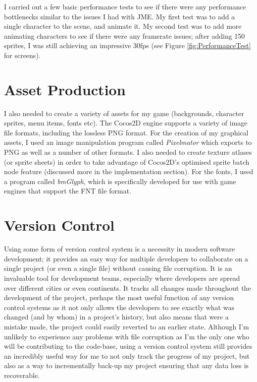 \documentclass[a4paper,oneside]{report}
\begin{document}
I carried out a few basic performance tests to see if there were any performance bottlenecks similar to the issues I had with JME. My first test was to add a single character to the scene, and animate it. My second test was to add more animating characters to see if there were any framerate issues; after adding 150 sprites, I was still achieving an impressive 30fps (see Figure \ref{fig:PerformanceTest} for screens). 

\section{Asset Production}

I also needed to create a variety of assets for my game (backgrounds, character sprites, menu items, fonts etc). The Cocos2D engine supports a variety of image file formats, including the lossless PNG format. For the creation of my graphical assets, I used an image manipulation program called \emph{Pixelmator} which exports to PNG as well as a number of other formats. I also needed to create texture atlases (or sprite sheets) in order to take advantage of Cocos2D's optimised sprite batch node feature (discussed more in the implementation section). For the fonts, I used a program called \emph{bmGlyph}, which is specifically developed for use with game engines that support the FNT file format.

\section{Version Control}

Using some form of version control system is a necessity in modern software development; it provides an easy way for multiple developers to collaborate on a single project (or even a single file) without causing file corruption. It is an invaluable tool for development teams, especially where developers are spread over different cities or even continents. It tracks all changes made throughout the development of the project, perhaps the most useful function of any version control systems as it not only allows the developers to see exactly what was changed (and by whom) in a project's history, but also means that were a mistake made, the project could easily reverted to an earlier state. Although I'm unlikely to experience any problems with file corruption as I'm the only one who will be contributing to the code-base, using a version control system still provides an incredibly useful way for me to not only track the progress of my project, but also as a way to incrementally back-up my project ensuring that any data loss is recoverable.
\end{document}
